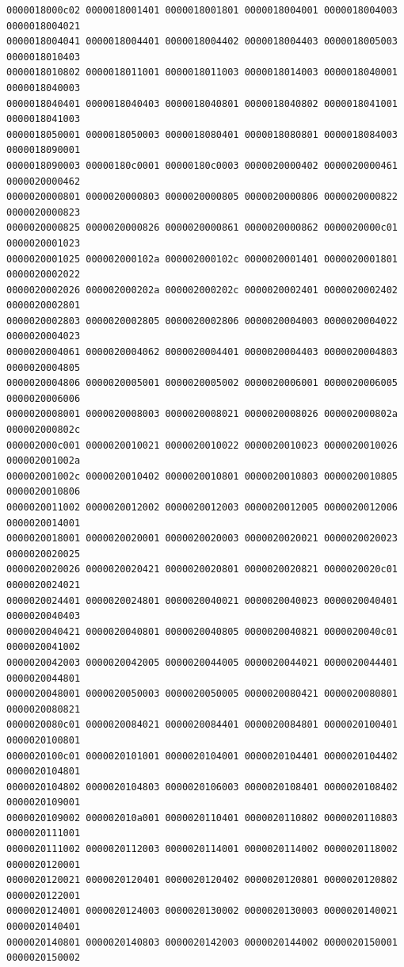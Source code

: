 \begin{Verbatim}[fontsize=\scriptsize]
0000018000c02 0000018001401 0000018001801 0000018004001 0000018004003 0000018004021
0000018004041 0000018004401 0000018004402 0000018004403 0000018005003 0000018010403
0000018010802 0000018011001 0000018011003 0000018014003 0000018040001 0000018040003
0000018040401 0000018040403 0000018040801 0000018040802 0000018041001 0000018041003
0000018050001 0000018050003 0000018080401 0000018080801 0000018084003 0000018090001
0000018090003 00000180c0001 00000180c0003 0000020000402 0000020000461 0000020000462
0000020000801 0000020000803 0000020000805 0000020000806 0000020000822 0000020000823
0000020000825 0000020000826 0000020000861 0000020000862 0000020000c01 0000020001023
0000020001025 000002000102a 000002000102c 0000020001401 0000020001801 0000020002022
0000020002026 000002000202a 000002000202c 0000020002401 0000020002402 0000020002801
0000020002803 0000020002805 0000020002806 0000020004003 0000020004022 0000020004023
0000020004061 0000020004062 0000020004401 0000020004403 0000020004803 0000020004805
0000020004806 0000020005001 0000020005002 0000020006001 0000020006005 0000020006006
0000020008001 0000020008003 0000020008021 0000020008026 000002000802a 000002000802c
000002000c001 0000020010021 0000020010022 0000020010023 0000020010026 000002001002a
000002001002c 0000020010402 0000020010801 0000020010803 0000020010805 0000020010806
0000020011002 0000020012002 0000020012003 0000020012005 0000020012006 0000020014001
0000020018001 0000020020001 0000020020003 0000020020021 0000020020023 0000020020025
0000020020026 0000020020421 0000020020801 0000020020821 0000020020c01 0000020024021
0000020024401 0000020024801 0000020040021 0000020040023 0000020040401 0000020040403
0000020040421 0000020040801 0000020040805 0000020040821 0000020040c01 0000020041002
0000020042003 0000020042005 0000020044005 0000020044021 0000020044401 0000020044801
0000020048001 0000020050003 0000020050005 0000020080421 0000020080801 0000020080821
0000020080c01 0000020084021 0000020084401 0000020084801 0000020100401 0000020100801
0000020100c01 0000020101001 0000020104001 0000020104401 0000020104402 0000020104801
0000020104802 0000020104803 0000020106003 0000020108401 0000020108402 0000020109001
0000020109002 000002010a001 0000020110401 0000020110802 0000020110803 0000020111001
0000020111002 0000020112003 0000020114001 0000020114002 0000020118002 0000020120001
0000020120021 0000020120401 0000020120402 0000020120801 0000020120802 0000020122001
0000020124001 0000020124003 0000020130002 0000020130003 0000020140021 0000020140401
0000020140801 0000020140803 0000020142003 0000020144002 0000020150001 0000020150002

\end{Verbatim}
